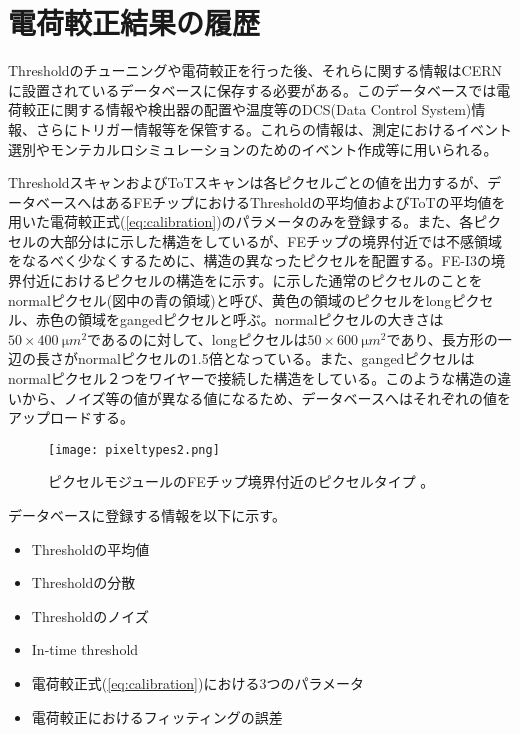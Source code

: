 \section{電荷較正結果の履歴}
\label{sec:probrem}
Thresholdのチューニングや電荷較正を行った後、それらに関する情報はCERNに設置されているデータベース\cite{pixeldb}に保存する必要がある。このデータベースでは電荷較正に関する情報や検出器の配置や温度等のDCS(Data Control System)情報、さらにトリガー情報等を保管する。これらの情報は、測定におけるイベント選別やモンテカルロシミュレーションのためのイベント作成等に用いられる。

ThresholdスキャンおよびToTスキャンは各ピクセルごとの値を出力するが、データベースへはあるFEチップにおけるThresholdの平均値およびToTの平均値を用いた電荷較正式(\ref{eq:calibration})のパラメータのみを登録する。また、各ピクセルの大部分はに示した構造をしているが、FEチップの境界付近では不感領域をなるべく少なくするために、構造の異なったピクセルを配置する。FE-I3の境界付近におけるピクセルの構造をに示す。に示した通常のピクセルのことをnormalピクセル(図中の青の領域)と呼び、黄色の領域のピクセルをlongピクセル、赤色の領域をgangedピクセルと呼ぶ。normalピクセルの大きさは$50\times 400\ \si{\micro m^2}$であるのに対して、longピクセルは$50\times 600\ \si{\micro m^2}$であり、長方形の一辺の長さがnormalピクセルの1.5倍となっている。また、gangedピクセルはnormalピクセル２つをワイヤーで接続した構造をしている。このような構造の違いから、ノイズ等の値が異なる値になるため、データベースへはそれぞれの値をアップロードする。

\begin{figure}[tbp]
  \centering
  \texttt{[image: pixeltypes2.png]}
  \caption[ピクセルモジュールのFEチップ境界付近のピクセルタイプ]{ピクセルモジュールのFEチップ境界付近のピクセルタイプ \cite{pixeltypes}。}
  \label{fig:pixeltypes}
\end{figure}

データベースに登録する情報を以下に示す。
\begin{itemize}
  \item Thresholdの平均値
  \item Thresholdの分散
  \item Thresholdのノイズ
  \item In-time threshold
  \item 電荷較正式(\ref{eq:calibration})における3つのパラメータ
  \item 電荷較正におけるフィッティングの誤差
\end{itemize}




\newpage

